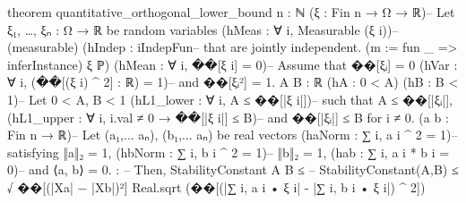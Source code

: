 \documentclass{article}
\begin{document}
\begin{leancode}
theorem quantitative_orthogonal_lower_bound
    {n : ℕ}
    (ξ : Fin n → Ω → ℝ)--                     Let ξ₁, …, ξₙ : Ω → ℝ be random variables
    (hMeas : ∀ i, Measurable (ξ i))--         (measurable)
    (hIndep : iIndepFun--                     that are jointly independent.
      (m := fun _ => inferInstance) ξ ℙ)
    (hMean : ∀ i, ��[ξ i] = 0)--               Assume that ��[ξᵢ] = 0
    (hVar : ∀ i, (��[(ξ i) ^ 2] : ℝ) = 1)--    and ��[ξᵢ²] = 1.
    {A B : ℝ} (hA : 0 < A) (hB : B < 1)--     Let 0 < A, B < 1
    (hL1_lower : ∀ i, A ≤ ��[|ξ i|])--         such that A ≤ ��[|ξᵢ|],
    (hL1_upper : ∀ i, i.val ≠ 0 → ��[|ξ i|] ≤ B)-- and ��[|ξᵢ|] ≤ B for i ≠ 0.
    (a b : Fin n → ℝ)--                       Let (a₁,... aₙ), (b₁,... aₙ) be real vectors
    (haNorm : ∑ i, a i ^ 2 = 1)--             satisfying ‖a‖₂ = 1,
    (hbNorm : ∑ i, b i ^ 2 = 1)--             ‖b‖₂ = 1,
    (hab : ∑ i, a i * b i = 0)--              and ⟨a, b⟩ = 0.
    : --                                      Then,
    StabilityConstant A B ≤ --                StabilityConstant(A,B) ≤ √ ��[(|Xa| − |Xb|)²]
      Real.sqrt (��[(|∑ i, a i • ξ i| - |∑ i, b i • ξ i|) ^ 2])
\end{leancode}
\end{document}
